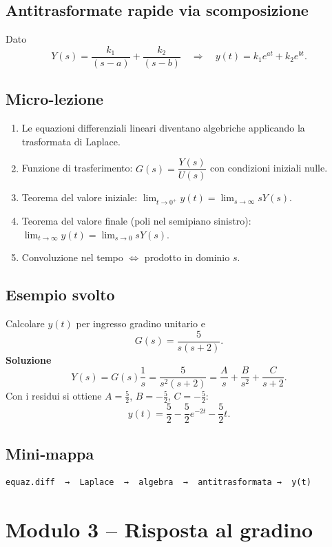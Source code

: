 \documentclass[a4paper,11pt]{article}
\begin{document}
\subsection*{Antitrasformate rapide via scomposizione}
Dato
\[
Y(s)=\frac{k_1}{(s-a)}+\frac{k_2}{(s-b)}
\quad\Longrightarrow\quad
y(t)=k_1 e^{a t}+k_2 e^{b t}.
\]

\subsection*{Micro-lezione}
\begin{enumerate}
  \item Le equazioni differenziali lineari diventano algebriche applicando la trasformata di Laplace.
  \item Funzione di trasferimento: $G(s)=\dfrac{Y(s)}{U(s)}$ con condizioni iniziali nulle.
  \item Teorema del valore iniziale: $\displaystyle \lim_{t\to0^+}y(t)=\lim_{s\to\infty}sY(s)$.
  \item Teorema del valore finale (poli nel semipiano sinistro): $\displaystyle \lim_{t\to\infty}y(t)=\lim_{s\to0}sY(s)$.
  \item Convoluzione nel tempo $\Longleftrightarrow$ prodotto in dominio $s$.
\end{enumerate}

\subsection*{Esempio svolto}
Calcolare $y(t)$ per ingresso gradino unitario e
\[
G(s)=\frac{5}{s(s+2)}.
\]
\textbf{Soluzione}\\
\[
Y(s)=G(s)\frac{1}{s}= \frac{5}{s^{2}(s+2)}
=\frac{A}{s}+\frac{B}{s^{2}}+\frac{C}{s+2}.
\]
Con i residui si ottiene $A=\tfrac{5}{2}$, $B=-\tfrac{5}{2}$, $C=-\tfrac{5}{2}$:
\[
y(t)=\frac{5}{2}-\frac{5}{2}e^{-2t}-\frac{5}{2}t.
\]

\subsection*{Mini‑mappa}
\begin{center}\small
\begin{verbatim}
equaz.diff  →  Laplace  →  algebra  →  antitrasformata →  y(t)
\end{verbatim}
\end{center}

\section{Modulo 3 – Risposta al gradino}
\end{document}
